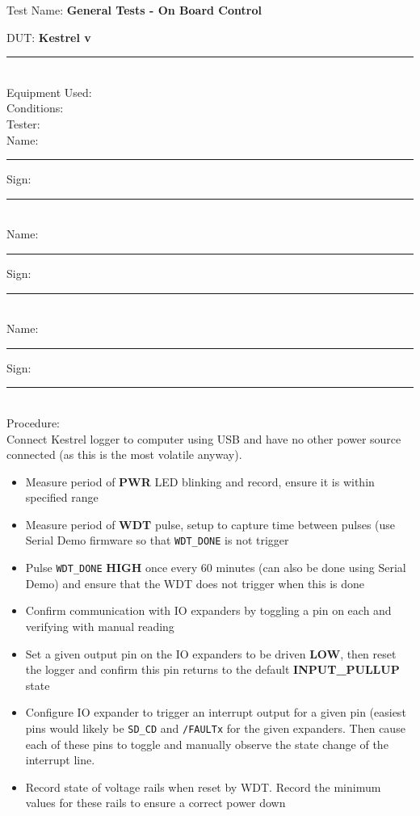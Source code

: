 \pagebreak
\noindent
{\Huge Test Name: \textbf{General Tests - On Board Control}}\\[20pt]
{\Large DUT: \textbf{Kestrel v}\rule{1cm}{0.15mm}} \\[10pt]
{\Large Equipment Used: }\\[40pt]
{\Large Conditions: }\\[40pt]
{\Large Tester: }\\[10pt]
Name: \rule{4cm}{0.15mm} \hfill Sign: \rule{4cm}{0.15mm}\\[5pt]
Name: \rule{4cm}{0.15mm} \hfill Sign: \rule{4cm}{0.15mm}\\[5pt]
Name: \rule{4cm}{0.15mm} \hfill Sign: \rule{4cm}{0.15mm}\\[15pt]
{\Large Procedure: }\\
Connect Kestrel logger to computer using USB and have no other power source connected (as this is the most volatile anyway). 

\begin{itemize}
\item Measure period of \textbf{PWR} LED blinking and record, ensure it is within specified range
\item Measure period of \textbf{WDT} pulse, setup to capture time between pulses (use Serial Demo firmware so that \texttt{WDT\_DONE} is not trigger
\item Pulse \texttt{WDT\_DONE} \textbf{HIGH} once every 60 minutes (can also be done using Serial Demo) and ensure that the WDT does not trigger when this is done 
\item Confirm communication with IO expanders by toggling a pin on each and verifying with manual reading
\item Set a given output pin on the IO expanders to be driven \textbf{LOW}, then reset the logger and confirm this pin returns to the default \textbf{INPUT\_PULLUP} state
\item Configure IO expander to trigger an interrupt output for a given pin (easiest pins would likely be \texttt{SD\_CD} and \texttt{/FAULTx} for the given expanders. Then cause each of these pins to toggle and manually observe the state change of the interrupt line. 
\item Record state of voltage rails when reset by WDT. Record the minimum values for these rails to ensure a correct power down 
\end{itemize}


